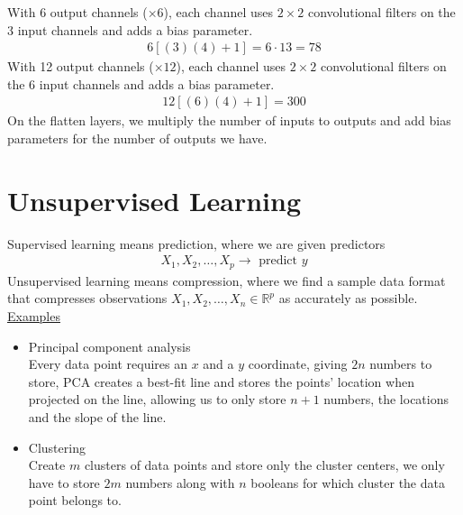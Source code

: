 \documentclass[12pt, letterpaper]{article}
\begin{document}
With 6 output channels ($\times 6$), each channel uses $2\times 2$ convolutional filters
on the 3 input channels and adds a bias parameter. 
\begin{align*}
    6[(3)(4)+1] = 6 \cdot 13 = 78
\end{align*}
With 12 output channels ($\times 12$), each channel uses $2\times 2$ convolutional filters
on the 6 input channels and adds a bias parameter.
\begin{align*}
    12[(6)(4)+1] = 300
\end{align*}
On the flatten layers, we multiply the number of inputs to outputs and add bias parameters 
for the number of outputs we have.

\section{Unsupervised Learning}
Supervised learning means prediction, where we are given predictors 
\begin{align*}
    X_1,X_2,\dots,X_p \rightarrow \text{ predict } y
\end{align*}
Unsupervised learning means compression, where we find a sample data format that 
compresses observations $X_1,X_2,\dots,X_n \in \mathbb{R}^p$ as accurately as possible. \\
\underline{Examples}
\begin{itemize}
    \item Principal component analysis \\
    Every data point requires an $x$ and a $y$ coordinate, giving $2n$ numbers to store,
    PCA creates a best-fit line and stores the points' location when projected on the 
    line, allowing us to only store $n+1$ numbers, the locations and the slope of the 
    line.
    \item Clustering \\
    Create $m$ clusters of data points and store only the cluster centers, we only have 
    to store $2m$ numbers along with $n$ booleans for which cluster the data point 
    belongs to.
\end{itemize}
\end{document}
